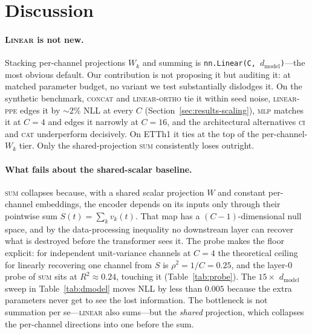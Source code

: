 \documentclass[11pt]{article}
\begin{document}
\section{Discussion}

\paragraph{\textsc{Linear} is not new.}
Stacking per-channel projections $W_k$ and summing is
\texttt{nn.Linear(C, $d_{\text{model}}$)}---the most obvious default.
Our contribution is not proposing it but auditing it: at matched
parameter budget, no variant we test substantially dislodges it.
On the synthetic benchmark, \textsc{concat} and \textsc{linear-ortho}
tie it within seed noise, \textsc{linear-ppe} edges it by
${\sim}2\%$ NLL at every $C$ (Section~\ref{sec:results-scaling}),
\textsc{mlp} matches it at $C{=}4$ and edges it narrowly at $C{=}16$,
and the architectural alternatives \textsc{ci} and \textsc{cat}
underperform decisively. On ETTh1 it ties at the top of the
per-channel-$W_k$ tier. Only the shared-projection \textsc{sum}
consistently loses outright.

\paragraph{What fails about the shared-scalar baseline.}
\textsc{sum} collapses because, with a shared scalar projection $W$
and constant per-channel embeddings, the encoder depends on its
inputs only through their pointwise sum $S(t) = \sum_k v_k(t)$.
That map has a $(C{-}1)$-dimensional null space, and by the
data-processing inequality no downstream layer can recover what is
destroyed before the transformer sees it. The probe makes the
floor explicit: for independent unit-variance channels at $C{=}4$
the theoretical ceiling for linearly recovering one channel from
$S$ is $\rho^2 = 1/C = 0.25$, and the layer-0 probe of
\textsc{sum} sits at $R^2 \approx 0.24$, touching it
(Table~\ref{tab:probe}). The $15{\times}$ $d_{\text{model}}$
sweep in Table~\ref{tab:dmodel} moves NLL by less than $0.005$
because the extra parameters never get to see the lost information.
The bottleneck is not summation per se---\textsc{linear} also
sums---but the \emph{shared} projection, which collapses the
per-channel directions into one before the sum.
\end{document}
